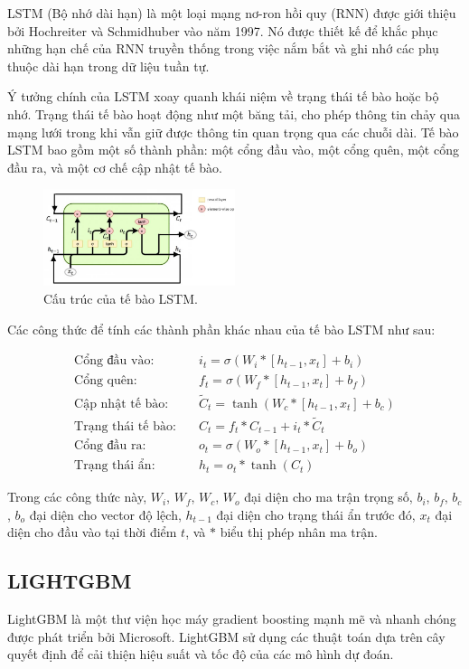 \documentclass{ieeeojies}
\begin{document}
LSTM (Bộ nhớ dài hạn) là một loại mạng nơ-ron hồi quy (RNN) được giới thiệu bởi Hochreiter và Schmidhuber vào năm 1997. Nó được thiết kế để khắc phục những hạn chế của RNN truyền thống trong việc nắm bắt và ghi nhớ các phụ thuộc dài hạn trong dữ liệu tuần tự.

Ý tưởng chính của LSTM xoay quanh khái niệm về trạng thái tế bào hoặc bộ nhớ. Trạng thái tế bào hoạt động như một băng tải, cho phép thông tin chảy qua mạng lưới trong khi vẫn giữ được thông tin quan trọng qua các chuỗi dài. Tế bào LSTM bao gồm một số thành phần: một cổng đầu vào, một cổng quên, một cổng đầu ra, và một cơ chế cập nhật tế bào.

\begin{figure}[h]
    \centering
    \includegraphics[width=0.5\textwidth]{bibliography/lstm.png}
  \caption{Cấu trúc của tế bào LSTM.}
\end{figure}

Các công thức để tính các thành phần khác nhau của tế bào LSTM như sau: 

\begin{align*}
\text{Cổng đầu vào:} \quad & i_t = \sigma(W_i * [h_{t-1}, x_t] + b_i) \\
\text{Cổng quên:} \quad & f_t = \sigma(W_f * [h_{t-1}, x_t] + b_f) \\
\text{Cập nhật tế bào:} \quad & \tilde{C}_t = \tanh(W_c * [h_{t-1}, x_t] + b_c) \\
\text{Trạng thái tế bào:} \quad & C_t = f_t * C_{t-1} + i_t * \tilde{C}_t \\
\text{Cổng đầu ra:} \quad & o_t = \sigma(W_o * [h_{t-1}, x_t] + b_o) \\
\text{Trạng thái ẩn:} \quad & h_t = o_t * \tanh(C_t)
\end{align*}

Trong các công thức này, $W_i$, $W_f$, $W_c$, $W_o$ đại diện cho ma trận trọng số, $b_i$, $b_f$, $b_c$, $b_o$ đại diện cho vector độ lệch, $h_{t-1}$ đại diện cho trạng thái ẩn trước đó, $x_t$ đại diện cho đầu vào tại thời điểm $t$, và $*$ biểu thị phép nhân ma trận.

\subsection{LIGHTGBM}
LightGBM là một thư viện học máy gradient boosting mạnh mẽ và nhanh chóng được phát triển bởi Microsoft. LightGBM sử dụng các thuật toán dựa trên cây quyết định để cải thiện hiệu suất và tốc độ của các mô hình dự đoán.
\end{document}
